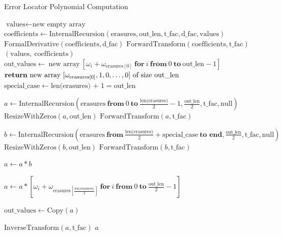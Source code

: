 \begin{algorithm}[!hbt]
    \caption{Error Locator Polynomial Computation}
    \begin{algorithmic}
            \State $\text{values} \gets \text{new empty array}$
            \State $\text{coefficients} \gets \text{InternalRecursion}(\text{erasures}, \text{out\_len}, \text{t\_fac}, \text{d\_fac}, \text{values})$
            \State $\text{FormalDerivative}(\text{coefficients}, \text{d\_fac})$
            \State $\text{ForwardTransform}(\text{coefficients}, \text{t\_fac})$
            \State \Return $(\text{values},\ \text{coefficients})$ 
        \EndFunction
                    \State $\text{out\_values} \gets\ \text{new array}\ [\omega_i + \omega_{\text{erasures}[0]}\ \textbf{for}\ i\ \textbf{from}\ 0\ \textbf{to}\ \text{out\_len} - 1]$
                \EndIf
                \State $\Return\ \text{new array}\ [\omega_{\text{erasures}[0]}, 1, 0, \ldots, 0]\ \text{of size}\ \text{out\_len}$
            \EndIf
            \State $\text{special\_case} \gets \text{len(erasures) + 1} = \text{out\_len}$

            \State $a \gets \text{InternalRecursion}(\text{erasures}\ \textbf{from}\ 0\ \textbf{to}\ \frac{\text{len(erasures)}}{2} - 1 , \frac{\text{out\_len}}{2}, \text{t\_fac}, \text{null})$
            \State $\text{ResizeWithZeros}(a, \text{out\_len})$
            \State $\text{ForwardTransform}(a, \text{t\_fac})$

            \State $b \gets \text{InternalRecursion}(\text{erasures}\ \textbf{from}\ \frac{\text{len(erasures)}}{2} + \text{special\_case}\ \textbf{to end}, \frac{\text{out\_len}}{2}, \text{t\_fac}, \text{null})$
            \State $\text{ResizeWithZeros}(b, \text{out\_len})$
            \State $\text{ForwardTransform}(b, \text{t\_fac})$

            \State $a \gets a * b$ 

                \State $a \gets a * [\omega_i + \omega_{\text{erasures}[\frac{\text{len(erasures)}}{2}]}\ \textbf{for}\ i\ \textbf{from}\ 0\ \textbf{to}\ \frac{\text{out\_len}}{2} - 1]$
            \EndIf

             
                \State $\text{out\_values} \gets \text{Copy}(a)$ 
            \EndIf

            \State $\text{InverseTransform}(a, \text{t\_fac})$ 
            \State \Return $a$
        \EndFunction
    \end{algorithmic}
\end{algorithm}

